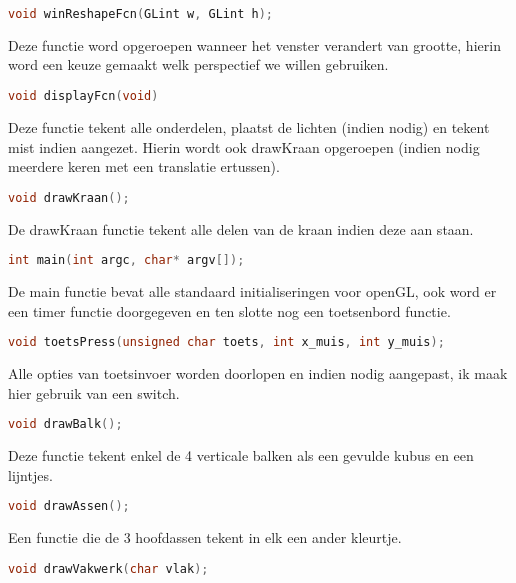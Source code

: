 \documentclass[a4paper, 12pt, one column]{article}
\begin{document}
\begin{lstlisting}[language=C]
    void winReshapeFcn(GLint w, GLint h);
\end{lstlisting}
Deze functie word opgeroepen wanneer het venster verandert van grootte, hierin word
een keuze gemaakt welk perspectief we willen gebruiken.

\begin{lstlisting}[language=C]
    void displayFcn(void)
\end{lstlisting}
Deze functie tekent alle onderdelen, plaatst de lichten (indien nodig) en tekent mist indien aangezet.
Hierin wordt ook drawKraan opgeroepen (indien nodig meerdere keren met een translatie ertussen).

\begin{lstlisting}[language=C]
    void drawKraan();
\end{lstlisting}
De drawKraan functie tekent alle delen van de kraan indien deze aan staan.

\begin{lstlisting}[language=C]
    int main(int argc, char* argv[]);
\end{lstlisting}
De main functie bevat alle standaard initialiseringen voor openGL, ook word er een timer functie 
doorgegeven en ten slotte nog een toetsenbord functie.

\begin{lstlisting}[language=C]
    void toetsPress(unsigned char toets, int x_muis, int y_muis);
\end{lstlisting}
Alle opties van toetsinvoer worden doorlopen en indien nodig aangepast, ik maak hier gebruik van 
een switch.

\begin{lstlisting}[language=C]
    void drawBalk();
\end{lstlisting}
Deze functie tekent enkel de 4 verticale balken als een gevulde kubus en een lijntjes.

\begin{lstlisting}[language=C]
    void drawAssen();
\end{lstlisting}
Een functie die de 3 hoofdassen tekent in elk een ander kleurtje.

\begin{lstlisting}[language=C]
    void drawVakwerk(char vlak);
\end{lstlisting}





\end{document}
